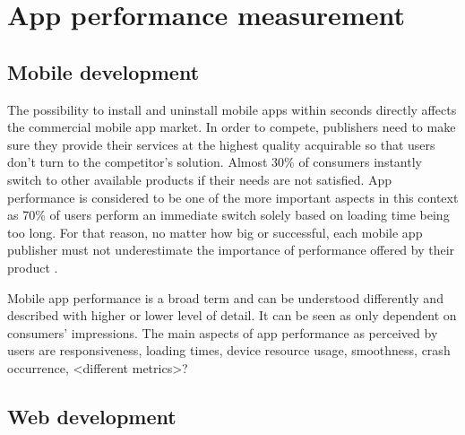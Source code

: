 
\chapter{App performance measurement}

\section{Mobile development}

The possibility to install and uninstall mobile apps within seconds directly affects the commercial mobile app market. In order to compete, publishers need to make sure they provide their services at the highest quality acquirable so that users don't turn to the competitor's solution. Almost 30\% of consumers instantly switch to other available products if their needs are not satisfied. App performance is considered to be one of the more important aspects in this context as 70\% of users perform an immediate switch solely based on loading time being too long. For that reason, no matter how big or successful, each mobile app publisher must not underestimate the importance of performance offered by their product \cite{micro_moments_guide}. 

Mobile app performance is a broad term and can be understood differently and described with higher or lower level of detail. It can be seen as only dependent on consumers' impressions. The main aspects of app performance as perceived by users are responsiveness, loading times, device resource usage, smoothness, crash occurrence, <different metrics>?

\section{Web development}
